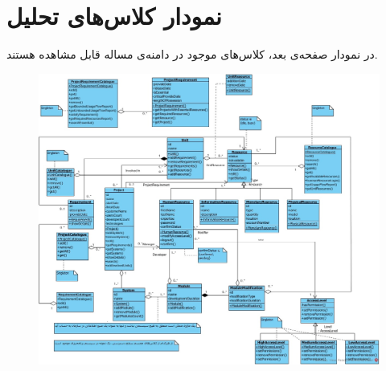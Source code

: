 \chapter{نمودار کلاس‌های تحلیل}
در نمودار صفحه‌ی بعد، کلاس‌های موجود در دامنه‌ی مساله قابل مشاهده هستند.

\newpage
\begin{landscape}
\begin{figure}[H]
	\centering
	\includegraphics[scale=0.55]{img/class-analysis/class_analysis}
\end{figure}
\end{landscape}

